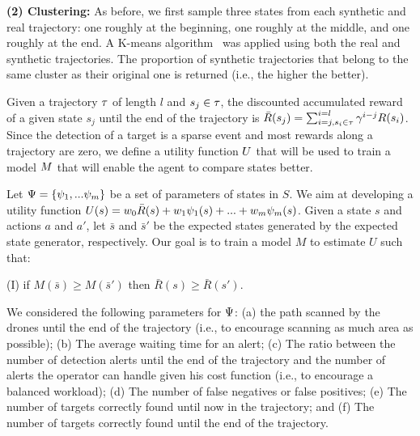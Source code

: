 \noindent\textbf{(2) Clustering:}
As before, we first sample three states from each synthetic and real trajectory: one roughly at the beginning, one roughly at the middle, and one roughly at the end. 
A K-means algorithm~\cite{jancey1966multidimensional, macqueen1967some,lloyd1982least, steinhaus1956division} was applied using both the real and synthetic trajectories. The proportion of synthetic trajectories that belong to the same cluster as their original one is returned (i.e., the higher the better).  

\label{subsub:UtilityFunction}
Given a trajectory $\tau$ of length $l$ and $s_j \in \tau$, the discounted accumulated reward of a given state $s_j$ until the end of the trajectory is $\bar{R}(s_j)=\sum_{i=j,s_i \in \tau}^{i=l} \gamma^{i-j} R(s_i)$.
Since the detection of a target is a sparse event and most rewards along a trajectory are zero, we define a utility function $U$ that will be used to train a model $M$  that will enable the agent to compare states better. 

Let $\Psi=\{\psi_1,...\psi_m\}$ 
be a set of parameters of states in $S$.
We aim at developing a utility function $U(s)=w_0 \bar{R}(s)+w_1 \psi_1(s)+...+w_m \psi_m(s)$.
Given a state $s$ and actions $a$ and $a'$, let $\bar{s}$ and $\bar{s}'$ be the expected states generated by the expected state generator, respectively.
Our goal is to train a model $M$ to estimate $U$ such that: 

(I) if $M(\bar{s}) \geq M(\bar{s}')$ then $\bar{R}(s) \geq \bar{R}(s')$.

We considered the following parameters for $\Psi$:
(a) the path scanned by the drones until the end of the trajectory (i.e., to encourage scanning as much area as possible); (b) The average waiting time for an alert; (c)  The ratio between the number of detection alerts until the end of the trajectory and the number of alerts the operator can handle given his cost function (i.e., to encourage a balanced workload);  (d) The number of false negatives or false positives; (e) The number of targets correctly found until now in the trajectory; and (f)  The number of targets correctly found until the end of the trajectory. 


